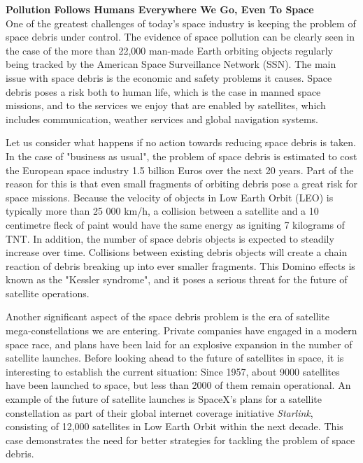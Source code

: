 \documentclass[a4paper]{article}
\begin{document}
\textbf{Pollution Follows Humans Everywhere We Go, Even To Space} \\


One of the greatest challenges of today's space industry is keeping the problem of space debris under control. The evidence of space pollution can be clearly seen in the case of the more than 22,000 man-made Earth orbiting objects regularly being tracked by the American Space Surveillance Network (SSN)\cite{ESA_space_debris_figures}. The main issue with space debris is the economic and safety problems it causes. Space debris poses a risk both to human life, which is the case in manned space missions, and to the services we enjoy that are enabled by satellites, which includes communication, weather services and global navigation systems. 


Let us consider what happens if no action towards reducing space debris is taken. In the case of "business as usual", the problem of space debris is estimated to cost the European space industry 1.5 billion Euros over the next 20 years\cite{space_debris_cost}. Part of the reason for this is that even small fragments of orbiting debris pose a great risk for space missions. Because the velocity of objects in Low Earth Orbit (LEO) is typically more than 25 000 km/h, a collision between a satellite and a 10 centimetre fleck of paint would have the same energy as igniting 7 kilograms of TNT\cite{kessler_syndrome_bigthink}. In addition, the number of space debris objects is expected to steadily increase over time. Collisions between existing debris objects will create a chain reaction of debris breaking up into ever smaller fragments. This Domino effects is known as the "Kessler syndrome"\cite{kessler_syndrome}, and it poses a serious threat for the future of satellite operations.


Another significant aspect of the space debris problem is the era of satellite mega-constellations we are entering. Private companies have engaged in a modern space race, and plans have been laid for an explosive expansion in the number of satellite launches. Before looking ahead to the future of satellites in space, it is interesting to establish the current situation: Since 1957, about 9000 satellites have been launched to space, but less than 2000 of them remain operational\cite{ESA_space_debris_figures}. An example of the future of satellite launches is SpaceX's plans for a satellite constellation as part of their global internet coverage initiative \textit{Starlink}, consisting of 12,000 satellites in Low Earth Orbit within the next decade\cite{ESA_constellation}. This case demonstrates the need for better strategies for tackling the problem of space debris.\\
\end{document}

